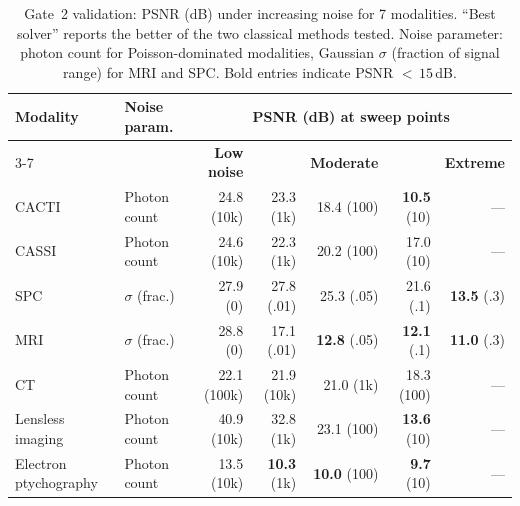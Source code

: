\documentclass[11pt]{article}
\begin{document}
\begin{table}[htbp]
\centering
\caption{Gate~2 validation: PSNR (dB) under increasing noise for 7
modalities.  ``Best solver'' reports the better of the two classical
methods tested.  Noise parameter: photon count for Poisson-dominated
modalities, Gaussian $\sigma$ (fraction of signal range) for
MRI and SPC.  Bold entries indicate PSNR ${<}\,15$\,dB.}
\label{tab:gate2}
\small
\begin{tabular}{l l r r r r r}
\toprule
\textbf{Modality} & \textbf{Noise param.} &
  \multicolumn{5}{c}{\textbf{PSNR (dB) at sweep points}} \\
\cmidrule(lr){3-7}
 & & \textbf{Low noise} & & \textbf{Moderate} & & \textbf{Extreme} \\
\midrule
CACTI & Photon count
  & 24.8 \scriptsize{(10k)} & 23.3 \scriptsize{(1k)} & 18.4 \scriptsize{(100)} & \textbf{10.5} \scriptsize{(10)} & --- \\
CASSI & Photon count
  & 24.6 \scriptsize{(10k)} & 22.3 \scriptsize{(1k)} & 20.2 \scriptsize{(100)} & 17.0 \scriptsize{(10)} & --- \\
SPC & $\sigma$ (frac.)
  & 27.9 \scriptsize{(0)} & 27.8 \scriptsize{(.01)} & 25.3 \scriptsize{(.05)} & 21.6 \scriptsize{(.1)} & \textbf{13.5} \scriptsize{(.3)} \\
MRI & $\sigma$ (frac.)
  & 28.8 \scriptsize{(0)} & 17.1 \scriptsize{(.01)} & \textbf{12.8} \scriptsize{(.05)} & \textbf{12.1} \scriptsize{(.1)} & \textbf{11.0} \scriptsize{(.3)} \\
CT & Photon count
  & 22.1 \scriptsize{(100k)} & 21.9 \scriptsize{(10k)} & 21.0 \scriptsize{(1k)} & 18.3 \scriptsize{(100)} & --- \\
Lensless imaging & Photon count
  & 40.9 \scriptsize{(10k)} & 32.8 \scriptsize{(1k)} & 23.1 \scriptsize{(100)} & \textbf{13.6} \scriptsize{(10)} & --- \\
Electron ptychography & Photon count
  & 13.5 \scriptsize{(10k)} & \textbf{10.3} \scriptsize{(1k)} & \textbf{10.0} \scriptsize{(100)} & \textbf{9.7} \scriptsize{(10)} & --- \\
\bottomrule
\end{tabular}
\end{table}
\end{document}
